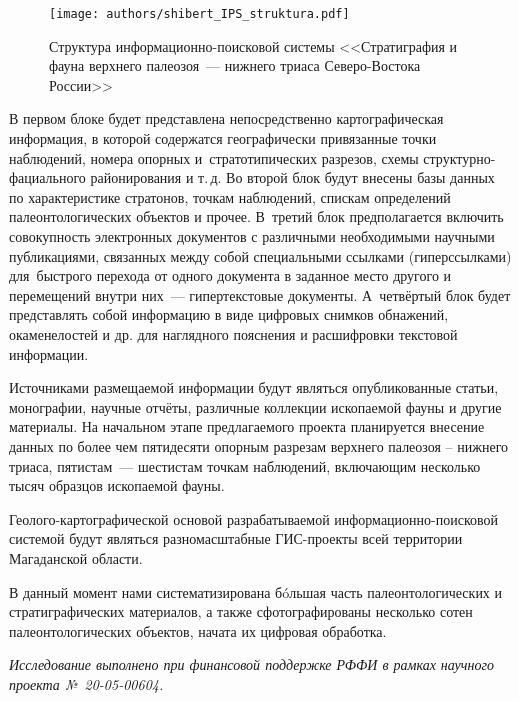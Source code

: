 \begin{figure}[H]
  \centering
  \texttt{[image: authors/shibert\_IPS\_struktura.pdf]}
  \caption{Структура информационно-поисковой системы <<Стратиграфия и фауна верхнего палеозоя~--- нижнего триаса Северо-Востока России>>}
  \label{fig:shibert_IPS_struktura.pdf}
\end{figure}

В первом блоке будет представлена непосредственно картографическая информация, в которой содержатся географически привязанные точки наблюдений, номера опорных и~стратотипических разрезов, схемы структурно-фациального районирования и т.\,д. Во второй блок будут внесены базы данных по характеристике стратонов, точкам наблюдений, спискам определений палеонтологических объектов и прочее. В~третий блок предполагается включить совокупность электронных документов с различными необходимыми научными публикациями, связанных между собой специальными ссылками (гиперссылками) для~быстрого перехода от одного документа в заданное место другого и перемещений внутри них~--- гипертекстовые документы. А~четвёртый блок будет представлять собой информацию в виде цифровых снимков обнажений, окаменелостей и др. для наглядного пояснения и расшифровки текстовой информации.

Источниками размещаемой информации будут являться опубликованные статьи, монографии, научные отчёты, различные коллекции ископаемой фауны и другие материалы. На начальном этапе предлагаемого проекта планируется внесение данных по более чем пятидесяти опорным разрезам верхнего палеозоя -- нижнего триаса, пятистам~--- шестистам точкам наблюдений, включающим несколько тысяч образцов ископаемой фауны.

Геолого-картографической основой разрабатываемой информационно-поисковой системой будут являться разномасштабные ГИС-проекты всей территории Магаданской области.

В данный момент нами систематизирована бóльшая часть палеонтологических и стратиграфических материалов, а также сфотографированы несколько сотен палеонтологических объектов, начата их цифровая обработка.

\textit{Исследование выполнено при финансовой поддержке РФФИ в рамках научного проекта №~20-05-00604.}


